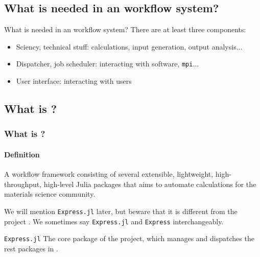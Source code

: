 \subsection{What is needed in an \ab{} workflow system?}

\begin{frame}{What is needed in an \ab{} workflow system?}
    There are at least three components:

    \begin{itemize}
        \item Sciency, technical stuff: calculations, input generation, output analysis...
        \item Dispatcher, job scheduler: interacting with \ab{} software, \texttt{mpi}...
        \item User interface: interacting with users
    \end{itemize}
\end{frame}

\subsection{What is \express{}?}

\begin{frame}
    \frametitle{What is \express{}?}
    \framesubtitle{Definition}

    \begin{definitionblock}{\express{}}
        A workflow framework consisting of several extensible, lightweight, high-throughput,
        high-level Julia packages that aims to automate \ab{} calculations for the materials
        science community.
    \end{definitionblock}

    We will mention \texttt{Express.jl} later, but beware that it is different from the
    project \express{}. We sometimes say \texttt{Express.jl} and \texttt{Express}
    interchangeably.

    \begin{definitionblock}{\texttt{Express.jl}}
        The core package of the \express{} project, which manages and dispatches the rest
        packages in \express{}.
    \end{definitionblock}
\end{frame}

